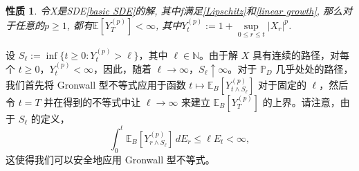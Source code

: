 \documentclass[12pt, final]{article}
\makeatletter
\numberwithin{equation}{section}
\numberwithin{figure}{section}
\numberwithin{table}{section}
\theoremstyle{plain}
\renewcommand{\proofname}{证明}
\newtheorem{Proposition}[Theorem]{性质} %
\theoremstyle{Definition}
\theoremstyle{Remark}
\renewenvironment{proof}[1][\proofname]{\par
	\pushQED{\qed}%
	\normalfont \topsep6\p@\@plus6\p@\relax
	\trivlist\item[\hskip\labelsep
	\bfseries #1\@addpunct{\, :\, }]\ignorespaces
}{%
	\popQED\endtrivlist\@endpefalse
}
\makeatother
\begin{document}
	\begin{Proposition}\label{main pro}
		令X是SDE\cref{basic SDE}的解, 其中f满足\cref{Lipschitz}和\cref{linear growth}, 那么对于任意的$p \ge 1$, 都有$\mathbb{E}[Y_T^{(p)}] < \infty$, 其中$Y_t^{(p)} := 1 + \sup\limits_{0\le r\le t}|X_r|^p$.
	\end{Proposition}
	\begin{proof}
	设 $S_{\ell} := \inf\{ t \geq 0 : Y_{t}^{(p)} > \ell \}$，其中 $\ell \in \mathbb{N}$。由于解 $X$ 具有连续的路径，对每个 $t \geq 0$，$Y_{t}^{(p)} < \infty$，因此，随着 $\ell \to \infty$，$S_{\ell} \uparrow \infty$。对于 $\mathbb{P}_D$ 几乎处处的路径，我们首先将 Gronwall 型不等式应用于函数 $t \mapsto \mathbb{E}_B[Y_{t \wedge S_{\ell}}^{(p)}]$ 对于固定的 $\ell$，然后令 $t = T$ 并在得到的不等式中让 $\ell \to \infty$ 来建立 $\mathbb{E}_B[Y_T^{(p)}]$ 的上界。请注意，由于 $S_{\ell}$ 的定义，
	\[
	\int_{0}^{t} \mathbb{E}_B[Y_{r \wedge S_{\ell}}^{(p)}] \, dE_r \leq \ell E_t < \infty,
	\]
	这使得我们可以安全地应用 Gronwall 型不等式。
	

\end{proof}
\end{document}
